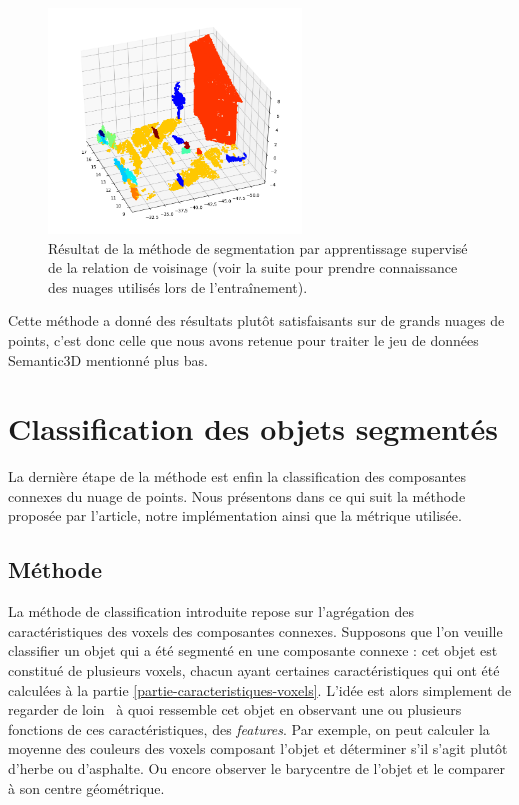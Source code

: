\documentclass[a4paper, onecolumn, 11pt]{article}
\begin{document}
\begin{figure}[h]
    \centering
    \includegraphics[width=0.6\textwidth]{fig/fourth_segmentation_supervised.png}
    \caption{Résultat de la méthode de segmentation par apprentissage supervisé de la relation de voisinage (voir la suite pour prendre connaissance des nuages utilisés lors de l'entraînement).}
    \label{fig:resultat-segmentation-supervisee}
\end{figure}

Cette méthode a donné des résultats plutôt satisfaisants sur de grands nuages de points, c'est donc celle que nous avons retenue pour traiter le jeu de données Semantic3D mentionné plus bas.

\section{Classification des objets segmentés}
La dernière étape de la méthode est enfin la classification des composantes connexes du nuage de points. Nous présentons dans ce qui suit la méthode proposée par l'article, notre implémentation ainsi que la métrique utilisée.

\subsection{Méthode}
La méthode de classification introduite repose sur l'agrégation des caractéristiques des voxels des composantes connexes. Supposons que l'on veuille classifier un objet qui a été segmenté en une composante connexe : cet objet est constitué de plusieurs voxels, chacun ayant certaines caractéristiques qui ont été calculées à la partie \ref{partie-caracteristiques-voxels}. L'idée est alors simplement de regarder \og de loin \fg\ à quoi ressemble cet objet en observant une ou plusieurs fonctions de ces caractéristiques, des \emph{features}. Par exemple, on peut calculer la moyenne des couleurs des voxels composant l'objet et déterminer s'il s'agit plutôt d'herbe ou d'asphalte. Ou encore observer le barycentre de l'objet et le comparer à son centre géométrique.
\end{document}
